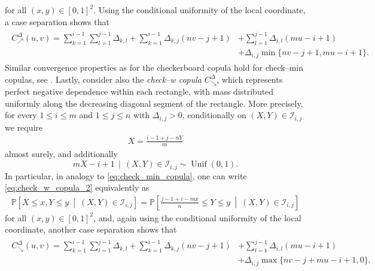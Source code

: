 \documentclass{article}
\theoremstyle{definition}
\newcommand{\II}{\mathcal{I}}  %
\newcommand{\Prob}{\mathbb{P}}  %
\DeclareMathOperator{\Unif}{Unif}  %
\begin{document}
for all $(x,y)\in [0,1]^2$. Using the conditional uniformity of the local coordinate, a case separation shows that
\begin{align}\label{frm:check_min}
    \begin{aligned}
    C^{\Delta}_{\nearrow}(u,v)
    = \sum_{k=1}^{i-1}\sum_{l=1}^{j-1} \Delta_{k,l}
      + \sum_{k=1}^{i-1}\Delta_{k,j} (nv-j+1)
    & + \sum_{l=1}^{j-1}\Delta_{i,l}(mu-i+1) \\
    & + \Delta_{i,j} \min{\{nv-j+1,mu-i+1\}}
    .\end{aligned}
\end{align}
Similar convergence properties as for the checkerboard copula hold for check--min copulas, see \cite{Mikusinski-2010}.
Lastly, consider also the \emph{check--w copula} \(C^{\Delta}_{\searrow}\), which represents perfect negative dependence within each rectangle, with mass distributed uniformly along the decreasing diagonal segment of the rectangle.
More precisely, for every $1\le i\le m$ and $1\le j\le n$ with $\Delta_{i,j}>0$, conditionally on $(X,Y)\in\II_{i,j}$ we require
\begin{align}\label{eq:check_w_copula_2}
    X = \frac{i - 1 + j - nY}{m}
\end{align}
almost surely, and additionally
\[
    mX-i+1 \,\mid\, (X,Y)\in\II_{i,j} \sim \Unif(0,1).
\]
In particular, in analogy to \eqref{eq:check_min_copula}, one can write \eqref{eq:check_w_copula_2} equivalently as
\begin{align*}%
    \Prob\left[X\leq x, Y\leq y~\middle|~(X,Y)\in \II_{i,j}\right]
    = \Prob\left[\frac{j-1+i-mx}n \leq Y \leq y~\middle|~ (X,Y)\in \II_{i,j}\right]
\end{align*}
for all $(x,y)\in [0,1]^2$, and, again using the conditional uniformity of the local coordinate, another case separation shows that
\begin{align}\label{frm:check_w}
    \begin{aligned}
    C^{\Delta}_{\searrow}(u,v)
    = \sum_{k=1}^{i-1}\sum_{l=1}^{j-1} \Delta_{k,l}
      + \sum_{k=1}^{i-1}\Delta_{k,j} (nv-j+1)
    & + \sum_{l=1}^{j-1}\Delta_{i,l}(mu-i+1) \\
    & + \Delta_{i,j} \max{\{nv-j + mu-i + 1, 0\}}
    .\end{aligned}
\end{align}
\end{document}
